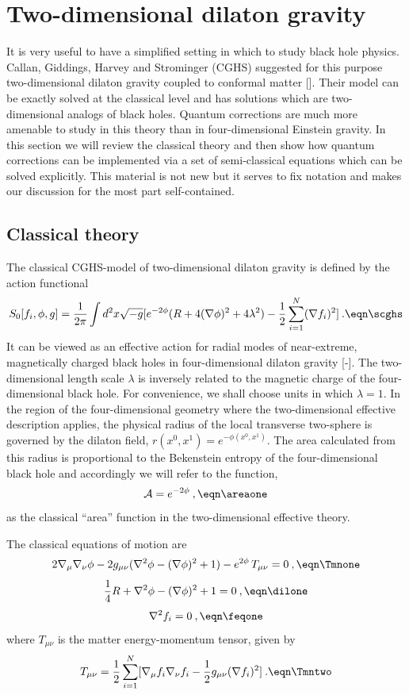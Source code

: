 %
%
\chapter{Two-dimensional dilaton gravity}

It is very useful to have a simplified setting in which to study
black hole physics.  Callan, Giddings, Harvey and Strominger (CGHS)
suggested for this purpose two-dimensional dilaton gravity coupled to
conformal matter [\CGHS]. Their model can be exactly solved at the
classical level and has solutions which are two-dimensional analogs
of black holes.  Quantum corrections are much more amenable to study
in this theory than in four-dimensional Einstein gravity.  In this
section we will review the classical theory and then show how quantum
corrections can be implemented via a set of semi-classical equations
which can be solved explicitly.  This material is not new but it
serves to fix notation and makes our discussion for the most part
self-contained.

\section{Classical theory}

The classical CGHS-model of two-dimensional dilaton gravity is
defined by the action functional
$$
S_0[f_i, \phi, g] =
{1 \over 2\pi} \int d^2x \sqrt{-g}[e^{-2\phi}
(R + 4(\nabla \phi)^2 + 4\lambda^2)
- \half \sum_{i=1}^N (\nabla f_i)^2] \>.
\eqn\scghs
$$
It can be viewed as an effective action for radial modes of
near-extreme, magnetically charged black holes in four-dimensional
dilaton gravity [\CGHS-\bddo].  The two-dimensional length scale
$\lambda$ is inversely related to the magnetic charge of the
four-dimensional black hole.  For convenience, we shall choose units
in which $\lambda = 1$.  In the region of the four-dimensional
geometry where the two-dimensional effective description applies, the
physical radius of the local transverse two-sphere is governed by the
dilaton field, $r(x^0,x^1)=e^{-\phi(x^0,x^1)}$.  The area calculated
from this radius is proportional to the Bekenstein entropy of the
four-dimensional black hole and accordingly we will refer to the
function,
$$
{\cal A} = e^{-2\phi} \>,
\eqn\areaone
$$
as the classical ``area'' function in the two-dimensional effective
theory.

The classical equations of motion are
$$
2 \nabla_\mu \nabla_\nu \phi - 2 g_{\mu \nu}
(\nabla^2 \phi - (\nabla \phi)^2 + 1)
- e^{2 \phi}\,T_{\mu \nu} = 0 \>,
\eqn\Tmnone
$$
$$
{1\over 4}R + \nabla^2 \phi
- (\nabla \phi)^2 + 1 = 0 \>,
\eqn\dilone
$$
$$
\nabla^2 f_i = 0  \>,
\eqn\feqone
$$
where $T_{\mu \nu}$ is the matter energy-momentum tensor, given by
$$
T_{\mu \nu} =
\half \sum_{i=1}^N [\nabla_\mu f_i\nabla_\nu f_i
- \half g_{\mu \nu} (\nabla f_i)^2] \>.
\eqn\Tmntwo
$$

